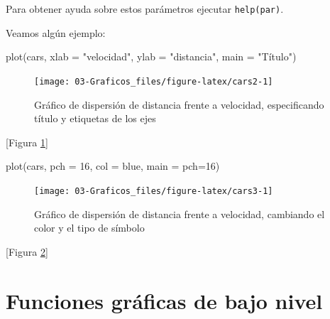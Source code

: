 \documentclass[
]{book}
\newenvironment{Shaded}{\begin{snugshade}}{\end{snugshade}}
\newcommand{\AttributeTok}[1]{\textcolor[rgb]{0.77,0.63,0.00}{#1}}
\newcommand{\DecValTok}[1]{\textcolor[rgb]{0.00,0.00,0.81}{#1}}
\newcommand{\FunctionTok}[1]{\textcolor[rgb]{0.00,0.00,0.00}{#1}}
\newcommand{\NormalTok}[1]{#1}
\newcommand{\StringTok}[1]{\textcolor[rgb]{0.31,0.60,0.02}{#1}}
\theoremstyle{break}
\theoremstyle{nonumberplain}
\begin{document}
Para obtener ayuda sobre estos parámetros ejecutar \texttt{help(par)}.

Veamos algún ejemplo:

\begin{Shaded}
\begin{Highlighting}[]
\FunctionTok{plot}\NormalTok{(cars, }\AttributeTok{xlab =} \StringTok{"velocidad"}\NormalTok{, }\AttributeTok{ylab =} \StringTok{"distancia"}\NormalTok{, }\AttributeTok{main =} \StringTok{"Título"}\NormalTok{)}
\end{Highlighting}
\end{Shaded}

\begin{figure}[!htb]

{\centering \texttt{[image: 03-Graficos\_files/figure-latex/cars2-1]} 

}

\caption{Gráfico de dispersión de distancia frente a velocidad, especificando título y etiquetas de los ejes}\label{fig:cars2}
\end{figure}

{[}Figura \ref{fig:cars2}{]}

\begin{Shaded}
\begin{Highlighting}[]
\FunctionTok{plot}\NormalTok{(cars, }\AttributeTok{pch =} \DecValTok{16}\NormalTok{, }\AttributeTok{col =} \StringTok{\textquotesingle{}blue\textquotesingle{}}\NormalTok{, }\AttributeTok{main =} \StringTok{\textquotesingle{}pch=16\textquotesingle{}}\NormalTok{)}
\end{Highlighting}
\end{Shaded}

\begin{figure}[!htb]

{\centering \texttt{[image: 03-Graficos\_files/figure-latex/cars3-1]} 

}

\caption{Gráfico de dispersión de distancia frente a velocidad, cambiando el color y el tipo de símbolo}\label{fig:cars3}
\end{figure}

{[}Figura \ref{fig:cars3}{]}

\hypertarget{funciones-gruxe1ficas-de-bajo-nivel}{%
\section{Funciones gráficas de bajo nivel}\label{funciones-gruxe1ficas-de-bajo-nivel}}
\end{document}
